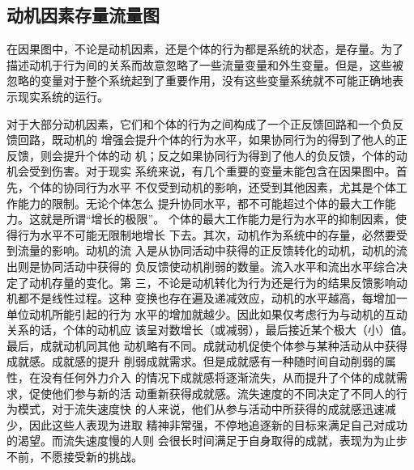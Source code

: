 \subsection{动机因素存量流量图}

在因果图中，不论是动机因素，还是个体的行为都是系统的状态，是存量。为了
描述动机于行为间的关系而故意忽略了一些流量变量和外生变量。但是，这些被
忽略的变量对于整个系统起到了重要作用，没有这些变量系统就不可能正确地表
示现实系统的运行。

对于大部分动机因素，它们和个体的行为之间构成了一个正反馈回路和一个负反
馈回路，既动机的
增强会提升个体的行为水平，如果协同行为的得到了他人的正反馈，则会提升个体的动
机；反之如果协同行为得到了他人的负反馈，个体的动机会受到伤害。对于现实
系统来说，有几个重要的变量未能包含在因果图中。首先，个体的协同行为水平
不仅受到动机的影响，还受到其他因素，尤其是个体工作能力的限制。无论个体怎么
提升协同水平，都不可能超过个体的最大工作能力。这就是所谓“增长的极限”。
个体的最大工作能力是行为水平的抑制因素，使得行为水平不可能无限制地增长
下去。其次，动机作为系统中的存量，必然要受到流量的影响。动机的流
入是从协同活动中获得的正反馈转化的动机，动机的流出则是协同活动中获得的
负反馈使动机削弱的数量。流入水平和流出水平综合决定了动机存量的变化。第
三，不论是动机转化为行为还是行为的结果反馈影响动机都不是线性过程。这种
变换也存在遍及递减效应，动机的水平越高，每增加一单位动机所能引起的行为
水平的增加就越少。因此如果仅考虑行为与动机的互动关系的话，个体的动机应
该呈对数增长（或减弱），最后接近某个极大（小）值。最后，成就动机同其他
动机略有不同。成就动机促使个体参与某种活动从中获得成就感。成就感的提升
削弱成就需求。但是成就感有一种随时间自动削弱的属性，在没有任何外力介入
的情况下成就感将逐渐流失，从而提升了个体的成就需求，促使他们参与新的活
动重新获得成就感。流失速度的不同决定了不同人的行为模式，对于流失速度快
的人来说，他们从参与活动中所获得的成就感迅速减少，因此这些人表现为进取
精神非常强，不停地追逐新的目标来满足自己对成功的渴望。而流失速度慢的人则
会很长时间满足于自身取得的成就，表现为为止步不前，不愿接受新的挑战。

